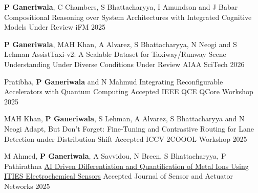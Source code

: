 \begin{cventries}
{}
\cventry
{\textbf{P Ganeriwala}, C Chambers, S Bhattacharyya, I Amundson and J Babar}
{Compositional Reasoning over System Architectures with Integrated Cognitive Models}
{Under Review}
{iFM 2025} 
{ %
\begin{cvitems}
\end{cvitems}
}
\cventry
{\textbf{P Ganeriwala}, MAH Khan, A Alvarez, S Bhattacharyya, N Neogi and S Lehman}
{AssistTaxi-v2: A Scalable Dataset for Taxiway/Runway Scene Understanding Under Diverse Conditions}
{Under Review}
{AIAA SciTech 2026} 
{ %
\begin{cvitems}
\end{cvitems}
}
\cventry
{Pratibha, \textbf{P Ganeriwala} and N Mahmud}
{Integrating Reconfigurable Accelerators with Quantum Computing}
{Accepted}
{IEEE QCE QCore Workshop 2025} 
{ %
\begin{cvitems}
\end{cvitems}
}
\cventry
{MAH Khan, \textbf{P Ganeriwala}, S Lehman, A Alvarez, S Bhattacharyya and N Neogi}
{
Adapt, But Don’t Forget: Fine-Tuning and Contrastive Routing for Lane Detection under Distribution Shift}
{Accepted}
{ICCV 2COOOL Workshop 2025} 
{ %
\begin{cvitems}
\end{cvitems}
}
\cventry
{M Ahmed, \textbf{P Ganeriwala}, A Savvidou, N
Breen, S Bhattacharyya, P Pathirathna}
{
\href{https://www.mdpi.com/2224-2708/14/4/70}{AI Driven Differentiation and Quantification of Metal Ions Using ITIES Electrochemical Sensors}}
{Accepted}
{Journal of Sensor and Actuator Networks 2025} 
{ %
}
\end{cventries}
